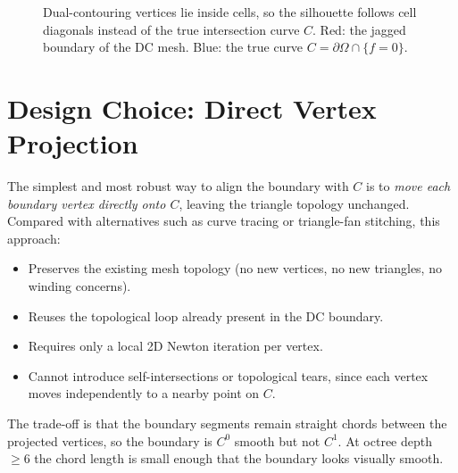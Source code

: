 \documentclass[11pt]{article}
\begin{document}
\begin{figure}[h]
  \centering
  \caption{\label{fig:jag} Dual-contouring vertices lie inside cells, so
    the silhouette follows cell diagonals instead of the true intersection
    curve $C$.  Red: the jagged boundary of the DC mesh.  Blue: the true
    curve $C = \partial\Omega \cap \{f=0\}$.}
\end{figure}

\section{Design Choice: Direct Vertex Projection}

The simplest and most robust way to align the boundary with $C$ is to
\emph{move each boundary vertex directly onto $C$}, leaving the triangle
topology unchanged.  Compared with alternatives such as curve tracing or
triangle-fan stitching, this approach:

\begin{itemize}
  \item Preserves the existing mesh topology (no new vertices, no new
        triangles, no winding concerns).
  \item Reuses the topological loop already present in the DC boundary.
  \item Requires only a local 2D Newton iteration per vertex.
  \item Cannot introduce self-intersections or topological tears, since
        each vertex moves independently to a nearby point on $C$.
\end{itemize}

The trade-off is that the boundary segments remain straight chords
between the projected vertices, so the boundary is $C^0$ smooth but not
$C^1$.  At octree depth $\geq 6$ the chord length is small enough that
the boundary looks visually smooth.
\end{document}
